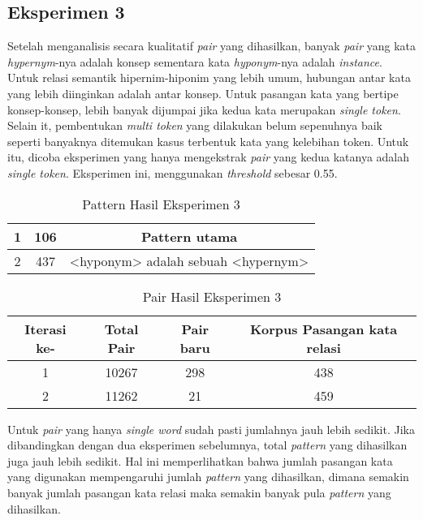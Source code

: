 \subsection{Eksperimen 3}
Setelah menganalisis secara kualitatif \textit{pair} yang dihasilkan, banyak \textit{pair} yang kata \textit{hypernym}-nya adalah konsep sementara kata \textit{hyponym}-nya adalah \textit{instance}. Untuk relasi semantik hipernim-hiponim yang lebih umum, hubungan antar kata yang lebih diinginkan adalah antar konsep. Untuk pasangan kata yang bertipe konsep-konsep, lebih banyak dijumpai jika kedua kata merupakan \textit{single token}. Selain it, pembentukan \textit{multi token} yang dilakukan belum sepenuhnya baik seperti banyaknya ditemukan kasus terbentuk kata yang kelebihan token. Untuk itu, dicoba eksperimen yang hanya mengekstrak \textit{pair} yang kedua katanya adalah \textit{single token}. Eksperimen ini, menggunakan \textit{threshold} sebesar 0.55.

\begin{table}
  \centering
  \caption{Pattern Hasil Eksperimen 3}
  \label{table:eksp3-pattern}
  \begin{tabular}{|c|c|c|}
  \hline
    1 & 106 & Pattern utama \\ \hline
    2 & 437 & <hyponym> adalah sebuah <hypernym> \\ \hline
  \end{tabular} 
\end{table}

\begin{table}
  \centering
  \caption{Pair Hasil Eksperimen 3}
  \label{table:eksp3-pair}
  \begin{tabular}{|c|c|c|c|}
  \hline
  Iterasi ke-  & Total Pair & Pair baru & Korpus Pasangan kata relasi \\ \hline
  1 & 10267 & 298 & 438 \\ \hline
  2 & 11262 & 21 & 459 \\ \hline
  \end{tabular} 
\end{table}

\noindent Untuk \textit{pair} yang hanya \textit{single word} sudah pasti jumlahnya jauh lebih sedikit. Jika dibandingkan dengan dua eksperimen sebelumnya, total \textit{pattern} yang dihasilkan juga jauh lebih sedikit. Hal ini memperlihatkan bahwa jumlah pasangan kata yang digunakan mempengaruhi jumlah \textit{pattern} yang dihasilkan, dimana semakin banyak jumlah pasangan kata relasi maka semakin banyak pula \textit{pattern} yang dihasilkan.

